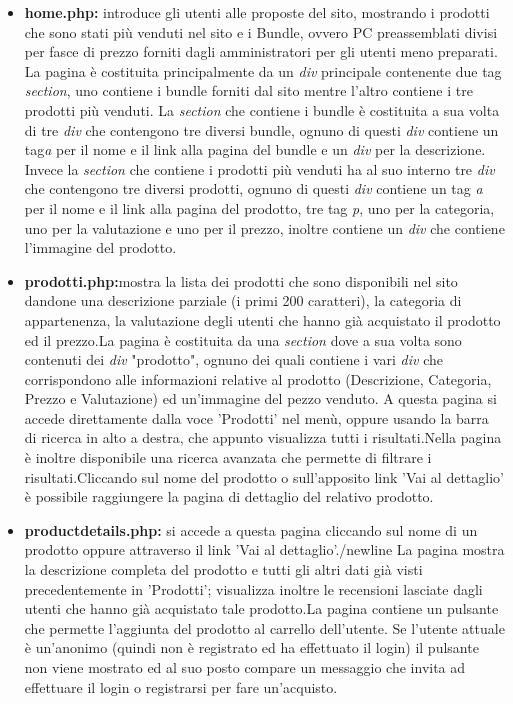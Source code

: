 \begin{itemize}
 \item \textbf{home.php:} introduce gli utenti alle proposte del sito, mostrando i prodotti che sono stati più venduti nel sito e i Bundle, ovvero PC preassemblati divisi per fasce di prezzo forniti dagli amministratori per gli utenti meno preparati.
 La pagina è costituita principalmente da un \emph{div} principale contenente due tag \emph{section}, uno contiene i bundle forniti dal sito mentre l'altro contiene i tre prodotti più venduti. 
 La \emph{section} che contiene i bundle è costituita a sua volta di tre \emph{div} che contengono tre diversi bundle, ognuno di questi \emph{div} contiene un tag\emph{a} per il nome e il link alla pagina del bundle e un \emph{div} per la descrizione.
 Invece la \emph{section} che contiene i prodotti più venduti ha al suo interno tre \emph{div} che contengono tre diversi prodotti, ognuno di questi \emph{div} contiene un tag \emph{a} per il nome e il link alla pagina del prodotto, tre tag \emph{p}, uno per la categoria, uno per la valutazione e uno per il prezzo, inoltre contiene un \emph{div} che contiene l'immagine del prodotto.
 
\item \textbf{prodotti.php:}mostra la lista dei prodotti che sono disponibili nel sito dandone una descrizione parziale (i primi 200 caratteri), la categoria di appartenenza, la valutazione degli utenti che hanno già acquistato il prodotto ed il prezzo.\newline La pagina è costituita da una \emph{section} dove a sua volta sono contenuti dei \emph{div} "prodotto", ognuno dei quali contiene i vari \emph{div} che corrispondono alle informazioni relative al prodotto (Descrizione, Categoria, Prezzo e Valutazione) ed un'immagine del pezzo venduto. A questa pagina si accede direttamente dalla voce 'Prodotti' nel menù, oppure usando la barra di ricerca in alto a destra, che appunto visualizza tutti i risultati.\newline Nella pagina è inoltre disponibile una ricerca avanzata che permette di filtrare i risultati.\newline Cliccando sul nome del prodotto o sull'apposito link 'Vai al dettaglio' è possibile raggiungere la pagina di dettaglio del relativo prodotto.

\item \textbf{productdetails.php:} si accede a questa pagina cliccando sul nome di un prodotto oppure attraverso il link 'Vai al dettaglio'./newline La pagina mostra la descrizione completa del prodotto e tutti gli altri dati già visti precedentemente in 'Prodotti'; visualizza inoltre le recensioni lasciate dagli utenti che hanno già acquistato tale prodotto.\newline La pagina contiene un pulsante che permette l'aggiunta del prodotto al carrello dell'utente. Se l'utente attuale è un'anonimo (quindi non è registrato ed ha effettuato il login) il pulsante non viene mostrato ed al suo posto compare un messaggio che invita ad effettuare il login o registrarsi per fare un'acquisto. 


\end{itemize}
